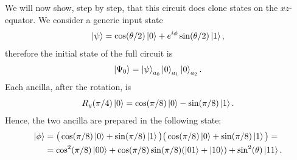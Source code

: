 We will now show, step by step, that this circuit does clone states on the $xz$-equator.
We consider a generic input state
\[
    \ket{\psi}=\cos(\theta/2)\ket{0}+e^{i\phi}\sin(\theta/2)\ket{1},
\]
therefore the initial state of the full circuit is
\[
    \ket{\Psi_0}=\ket{\psi}_{a_0}\ket{0}_{a_1}\ket{0}_{a_2}.
\]
Each ancilla, after the rotation, is
\[
    R_y(\pi/4)\ket{0}=\cos(\pi/8)\ket{0}-\sin(\pi/8)\ket{1}.
\]
Hence, the two ancilla are prepared in the following state:
\[
    \begin{split}
    \ket{\phi}&=\big(\cos(\pi/8)\ket{0}+\sin(\pi/8)\ket{1}\big)\big(\cos(\pi/8)\ket{0}+\sin(\pi/8)\ket{1}\big)=\\
    &=\cos^2(\pi/8)\ket{00}+\cos(\pi/8)\sin(\pi/8)(\ket{01}+\ket{10})+\sin^2(\theta)\ket{11}.
    \end{split}
\]

